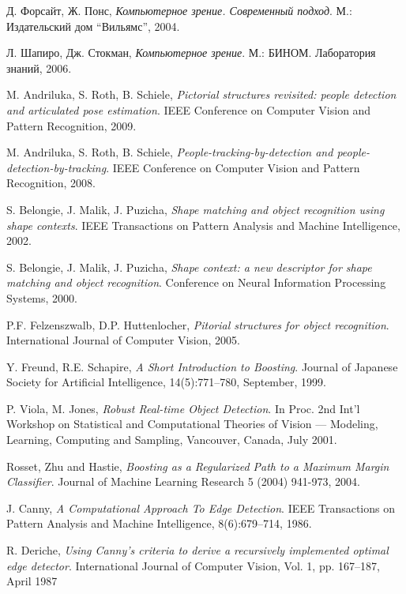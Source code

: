 \begin{thebibliography}{99}

  Д. Форсайт, Ж. Понс,
  \emph{Компьютерное зрение. Современный подход}.
  М.: Издательский дом ``Вильямс'',
  2004.

  Л. Шапиро, Дж. Стокман,
  \emph{Компьютерное зрение}.
  М.: БИНОМ. Лаборатория знаний,
  2006.

  M. Andriluka, S. Roth, B. Schiele,
  \emph{Pictorial structures revisited: people detection and articulated pose estimation}.
  IEEE Conference on Computer Vision and Pattern Recognition,
  2009.

  M. Andriluka, S. Roth, B. Schiele,
  \emph{People-tracking-by-detection and people-detection-by-tracking}.
  IEEE Conference on Computer Vision and Pattern Recognition,
  2008.

  S. Belongie, J. Malik, J. Puzicha,
  \emph{Shape matching and object recognition using shape contexts}.
  IEEE Transactions on Pattern Analysis and Machine Intelligence,
  2002.

  S. Belongie, J. Malik, J. Puzicha,
  \emph{Shape context: a new descriptor for shape matching and object recognition}.
  Conference on Neural Information Processing Systems,
  2000.

  P.F. Felzenszwalb, D.P. Huttenlocher,
  \emph{Pitorial structures for object recognition}.
  International Journal of Computer Vision,
  2005.

  Y. Freund, R.E. Schapire,
  \emph{A Short Introduction to Boosting}.
  Journal of Japanese Society for Artificial Intelligence, 14(5):771--780, September,
  1999.

  P. Viola, M. Jones,
  \emph{Robust Real-time Object Detection}.
  In Proc. 2nd Int'l Workshop on Statistical and Computational Theories of Vision --- Modeling, Learning, Computing and Sampling, Vancouver, Canada,
  July 2001.

  Rosset, Zhu and Hastie,
  \emph{Boosting as a Regularized Path to a Maximum Margin Classifier}.
  Journal of Machine Learning Research 5 (2004) 941-973,
  2004.

  J. Canny,
  \emph{A Computational Approach To Edge Detection}.
  IEEE Transactions on Pattern Analysis and Machine Intelligence, 8(6):679–714,
  1986.

  R. Deriche,
  \emph{Using Canny's criteria to derive a recursively implemented optimal edge detector}.
  International Journal of Computer Vision, Vol. 1, pp. 167–187,
  April 1987


\end{thebibliography}
